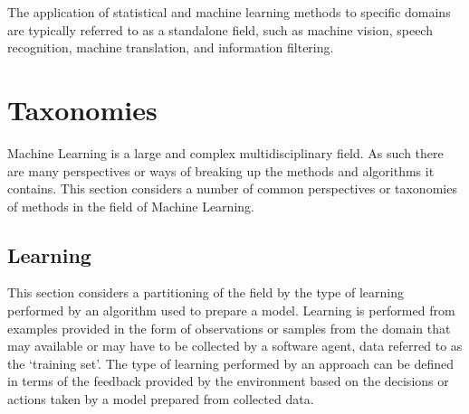 \documentclass[a4paper, 11pt]{article}
\begin{document}
The application of statistical and machine learning methods to specific domains are typically referred to as a standalone field, such as machine vision, speech recognition, machine translation, and information filtering.

%
%
\section{Taxonomies}
\label{sec:taxonomies}
Machine Learning is a large and complex multidisciplinary field. As such there are many perspectives or ways of breaking up the methods and algorithms it contains. This section considers a number of common perspectives or taxonomies of methods in the field of Machine Learning.

\subsection{Learning}
\label{subsec:learning}
This section considers a partitioning of the field by the type of learning performed by an algorithm used to prepare a model. Learning is performed from examples provided in the form of observations or samples from the domain that may available or may have to be collected by a software agent, data referred to as the `training set'. The type of learning performed by an approach can be defined in terms of the feedback provided by the environment based on the decisions or actions taken by a model prepared from collected data.
\end{document}
